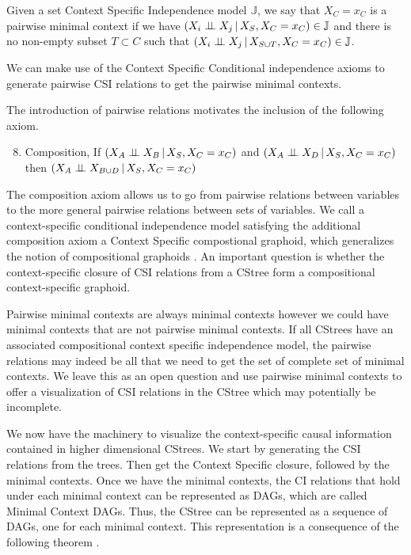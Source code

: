 \documentclass{tufte-book}
\begin{document}
\begin{definition}\label{def:pairmcs}
Given a set Context Specific Independence model $\mathbb{J}$, we say that ${X_C=x_C}$ is a pairwise minimal context if we have $(X_i  \perp \!\!\! \perp X_j \,|\, X_S, X_C=x_C) \in \mathbb{J}$ and there is no non-empty subset $T \subset C$ such that $(X_i \perp \!\!\! \perp X_j \,|\, X_{S \cup T}, X_C=x_C) \in \mathbb{J}$.
\end{definition}

We can make use of the Context Specific Conditional independence axioms to generate pairwise CSI relations to get the pairwise minimal contexts.


The introduction of pairwise relations motivates the inclusion of the following axiom.
\begin{enumerate}
\setcounter{enumi}{7}
\item Composition, If \((X_A \perp \!\!\! \perp X_B \,|\, X_S, X_C=x_C)\) and \((X_A \perp \!\!\! \perp X_D \,|\,X_S,X_C=x_C)\) then \((X_A \perp \!\!\! \perp X_{B\cup D} \,|\,X_S,X_C=x_C)\)
\end{enumerate}


The composition axiom allows us to go from pairwise relations between variables to the more general pairwise relations between sets of variables. We call a context-specific conditional independence model satisfying the additional composition axiom a Context Specific compostional graphoid, which generalizes the notion of compositional graphoids \cite{sadeghi-2014-markov-proper}. An important question is whether the context-specific closure of CSI relations from a CStree form a compositional context-specific graphoid.


Pairwise minimal contexts are always minimal contexts however we could have minimal contexts that are not pairwise minimal contexts. If all CStrees have an associated compositional context specific independence model, the pairwise relations may indeed be all that we need to get the set of complete set of minimal contexts. We leave this as an open question and use pairwise minimal contexts to offer a visualization of CSI relations in the CStree which may potentially be incomplete.



We now have the machinery to visualize the context-specific causal information contained in higher dimensional CStrees. We start by generating the CSI relations from the trees. Then get the Context Specific closure, followed by the minimal contexts. Once we have the minimal contexts, the CI relations that hold under each minimal context can be represented as DAGs, which are called  Minimal Context DAGs. Thus, the CStree can be represented as a sequence of DAGs, one for each minimal context. This representation is a consequence of the following theorem \cite{duarte-2021-repres-contex}.
\end{document}
